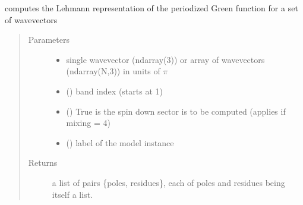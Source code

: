 \documentclass[letterpaper,10pt,english]{sphinxmanual}
\begin{document}
\begin{fulllineitems}
\label{\detokenize{functions:pyqcm.Lehmann_Green_function}}
\sphinxAtStartPar
computes the Lehmann representation of the periodized Green function for a set of wavevectors
\begin{quote}\begin{description}
\item[{Parameters}] \leavevmode\begin{itemize}
\item {} 
\sphinxAtStartPar
{} \textendash{} single wavevector (ndarray(3)) or array of wavevectors (ndarray(N,3)) in units of \(\pi\)

\item {} 
\sphinxAtStartPar
{} () \textendash{} band index (starts at 1)

\item {} 
\sphinxAtStartPar
{} () \textendash{} True is the spin down sector is to be computed (applies if mixing = 4)

\item {} 
\sphinxAtStartPar
{} () \textendash{} label of the model instance

\end{itemize}

\item[{Returns}] \leavevmode
\sphinxAtStartPar
a list of pairs \{poles, residues\}, each of poles and residues being itself a list.

\end{description}\end{quote}

\end{fulllineitems}

\end{document}
